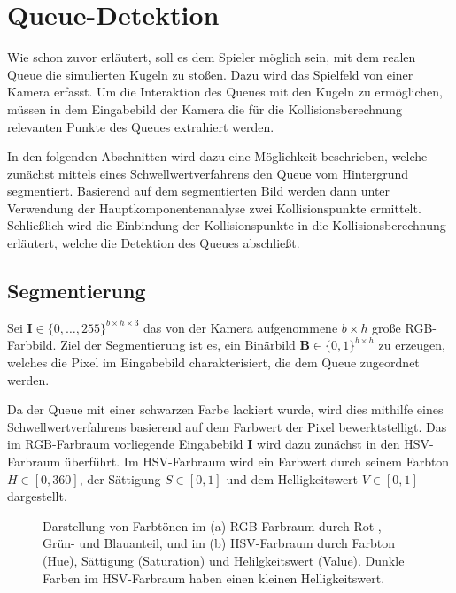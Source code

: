 \section{Queue-Detektion}

Wie schon zuvor erläutert, soll es dem Spieler möglich sein, mit dem realen Queue die simulierten Kugeln zu stoßen.
Dazu wird das Spielfeld von einer Kamera erfasst. 
Um die Interaktion des Queues mit den Kugeln zu ermöglichen, müssen in dem Eingabebild der Kamera die für die Kollisionsberechnung relevanten Punkte des Queues extrahiert werden.

In den folgenden Abschnitten wird dazu eine Möglichkeit beschrieben, welche zunächst mittels eines Schwellwertverfahrens den Queue vom Hintergrund segmentiert.
Basierend auf dem segmentierten Bild werden dann unter Verwendung der Hauptkomponentenanalyse zwei Kollisionspunkte ermittelt.
Schließlich wird die Einbindung der Kollisionspunkte in die Kollisionsberechnung erläutert, welche die Detektion des Queues abschließt.

\subsection{Segmentierung}
Sei $\textbf{I} \in \{0, \dots, 255\}^{b \times h \times 3}$ das von der Kamera aufgenommene $b \times h$ große RGB-Farbbild.
Ziel der Segmentierung ist es, ein Binärbild $\textbf{B} \in \{0,1\}^{b \times h}$ zu erzeugen, welches die Pixel im Eingabebild charakterisiert, die dem Queue zugeordnet werden.

Da der Queue mit einer schwarzen Farbe lackiert wurde, wird dies mithilfe eines Schwellwertverfahrens basierend auf dem Farbwert der Pixel bewerktstelligt.
Das im RGB-Farbraum vorliegende Eingabebild $\textbf{I}$ wird dazu zunächst in den HSV-Farbraum überführt. 
Im HSV-Farbraum wird ein Farbwert durch seinem Farbton $H \in [0, 360]$, der Sättigung $S \in [0, 1]$ und dem Helligkeitswert $V \in [0, 1]$ dargestellt.

\begin{figure}[H]
	\label{fig:HSVRGB}
	\centering
	\caption{Darstellung von Farbtönen im (a) RGB-Farbraum \cite{RGBCube} durch Rot-, Grün- und Blauanteil, und im (b) HSV-Farbraum \cite{HSVCylinder} durch Farbton (Hue), Sättigung (Saturation) und Helilgkeitswert (Value). Dunkle Farben im HSV-Farbraum haben einen kleinen Helligkeitswert.}
\end{figure}

